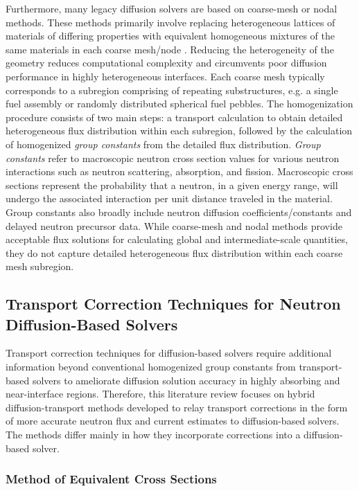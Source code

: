 Furthermore, many legacy diffusion solvers are based on coarse-mesh or nodal methods. These methods
primarily involve replacing heterogeneous lattices of materials of differing properties with
equivalent homogeneous mixtures of the same materials in each coarse mesh/node
\cite{stacey_nuclear_2007}. Reducing the heterogeneity of the geometry reduces computational
complexity and circumvents poor diffusion performance in highly heterogeneous interfaces. Each
coarse mesh typically corresponds to a subregion comprising of repeating substructures, e.g. a
single fuel assembly or randomly distributed spherical fuel pebbles. The homogenization procedure
consists of two main steps: a transport calculation to obtain detailed heterogeneous flux
distribution within each subregion, followed by the calculation of homogenized
\textit{group constants} from the detailed flux distribution. \textit{Group constants} refer to
macroscopic neutron cross section values for various neutron interactions such as neutron
scattering, absorption, and fission. Macroscopic cross sections represent the probability that a
neutron, in a given energy range, will undergo the associated interaction per unit distance
traveled in the material. Group constants also broadly include neutron diffusion
coefficients/constants and delayed neutron precursor data. While coarse-mesh and nodal methods
provide acceptable flux solutions for calculating global and intermediate-scale quantities, they do
not capture detailed heterogeneous flux distribution within each coarse mesh subregion.

\subsection{Transport Correction Techniques for Neutron Diffusion-Based Solvers}

Transport correction techniques for diffusion-based solvers require additional information beyond
conventional homogenized group constants from transport-based solvers to ameliorate diffusion
solution accuracy in highly absorbing and near-interface regions.
Therefore, this literature review focuses on hybrid diffusion-transport methods developed to relay
transport corrections in the form of more accurate neutron flux and current estimates to
diffusion-based solvers. The methods differ mainly in how they incorporate corrections into a
diffusion-based solver.

\subsubsection{Method of Equivalent Cross Sections}


